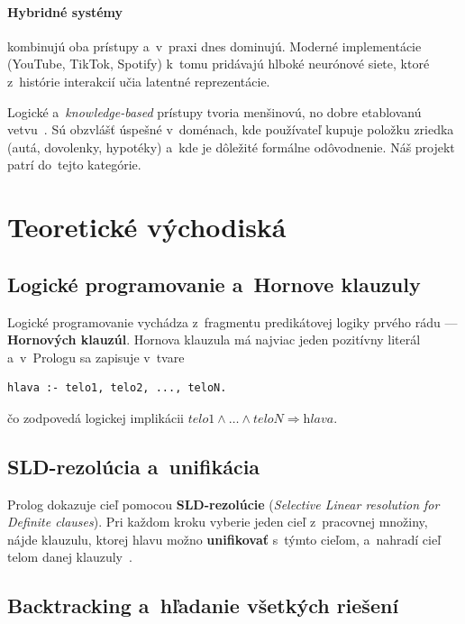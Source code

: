 \documentclass[11pt,a4paper]{article}
\begin{document}
\paragraph{Hybridné systémy} kombinujú oba prístupy a~v~praxi
dnes dominujú. Moderné implementácie (YouTube, TikTok, Spotify)
k~tomu pridávajú hlboké neurónové siete, ktoré z~histórie
interakcií učia latentné reprezentácie.

Logické a~\emph{knowledge-based} prístupy tvoria menšinovú,
no dobre etablovanú vetvu~\cite{burke2000,felfernig2008}. Sú
obzvlášť úspešné v~doménach, kde používateľ kupuje položku
zriedka (autá, dovolenky, hypotéky) a~kde je dôležité formálne
odôvodnenie. Náš projekt patrí do~tejto kategórie.

\section{Teoretické východiská}

\subsection{Logické programovanie a~Hornove klauzuly}

Logické programovanie vychádza z~fragmentu predikátovej logiky
prvého rádu --- \textbf{Hornových klauzúl}. Hornova klauzula má
najviac jeden pozitívny literál a~v~Prologu sa zapisuje v~tvare

\begin{lstlisting}[numbers=none]
hlava :- telo1, telo2, ..., teloN.
\end{lstlisting}

\noindent
čo zodpovedá logickej implikácii
$\textit{telo1} \land \dots \land \textit{teloN} \Rightarrow
\textit{hlava}$.

\subsection{SLD-rezolúcia a~unifikácia}

Prolog dokazuje cieľ pomocou \textbf{SLD-rezolúcie}
(\emph{Selective Linear resolution for Definite clauses}).
Pri každom kroku vyberie jeden cieľ z~pracovnej množiny, nájde
klauzulu, ktorej hlavu možno \textbf{unifikovať} s~týmto cieľom,
a~nahradí cieľ telom danej klauzuly~\cite{lloyd1987}.

\subsection{Backtracking a~hľadanie všetkých riešení}
\end{document}
